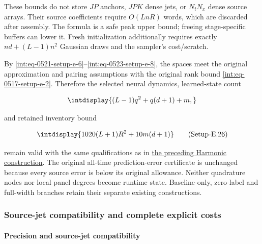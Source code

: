These bounds do not store \(JP\) anchors, \(JPK\) dense jets, or \(N_tN_x\) dense source arrays. Their source coefficients require \(O(LnR)\) words, which are discarded after assembly. The formula is a safe peak upper bound; freeing stage-specific buffers can lower it. Fresh initialization additionally requires exactly \(nd+(L-1)n^2\) Gaussian draws and the sampler's cost/scratch.



By \hyperref[int:eq-setup-e-6]{\eqref{int:eq-0521-setup-e-6}}--\allowbreak \hyperref[int:eq-setup-e-8]{\eqref{int:eq-0523-setup-e-8}}, the spaces meet the original approximation and pairing assumptions with the original rank bound \hyperref[int:eq-setup-e-2]{\eqref{int:eq-0517-setup-e-2}}. Therefore the selected neural dynamics, learned-state count


\begingroup\renewcommand{\theHequation}{intdisplay.1031}
\begin{equation*}
\intdisplay{
(L-1)q^2+q(d+1)+m,
}
\end{equation*}
\endgroup


and retained inventory bound


\label{int:eq-setup-e-26}
\begingroup\renewcommand{\theHequation}{intdisplay.1032}
\begin{equation}
\intdisplay{
1020(L+1)R^2+10m(d+1)
}
\tag{Setup-E.26}
\label{int:eq-0541-setup-e-26}
\end{equation}
\endgroup


remain valid with the same qualifications as in \hyperref[int:harmonic-construction]{the preceding Harmonic construction}. The original all-time prediction-error certificate is unchanged because every source error is below its original allowance. Neither quadrature nodes nor local panel degrees become runtime state. Baseline-only, zero-label and full-width branches retain their separate existing constructions.


\subsubsection{Source-jet compatibility and complete explicit costs}
\label{int:setup-bridge}

\paragraph{Precision and source-jet compatibility}
\label{int:setup-bridge-1}
\mbox{}\par\smallskip

